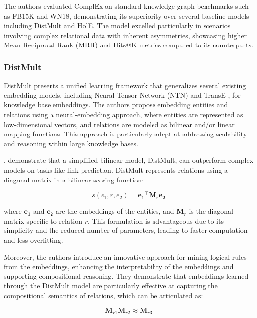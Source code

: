 \documentclass[12pt]{article}
\begin{document}
\sloppy
The authors evaluated ComplEx on standard knowledge graph benchmarks such as FB15K and WN18, demonstrating its superiority over several baseline models including DistMult and HolE. The model excelled particularly in scenarios involving complex relational data with inherent asymmetries, showcasing higher Mean Reciprocal Rank (MRR) and Hits@K metrics compared to its counterparts.
\sloppy

\subsubsection{DistMult}
DistMult \textcite{yang2015embedding} presents a unified learning framework that generalizes several existing embedding models, including Neural Tensor Network (NTN) and TransE \textcite{bordes2013translating}, for knowledge base embeddings. The authors propose embedding entities and relations using a neural-embedding approach, where entities are represented as low-dimensional vectors, and relations are modeled as bilinear and/or linear mapping functions. This approach is particularly adept at addressing scalability and reasoning within large knowledge bases.

\textcite{yang2015embedding}. demonstrate that a simplified bilinear model, DistMult, can outperform complex models on tasks like link prediction. DistMult represents relations using a diagonal matrix in a bilinear scoring function:

\begin{equation}
s(e_1, r, e_2) = \mathbf{e_1}^\top \mathbf{M}_r \mathbf{e_2}
\end{equation}

where $\mathbf{e_1}$ and $\mathbf{e_2}$ are the embeddings of the entities, and $\mathbf{M}_r$ is the diagonal matrix specific to relation $r$. This formulation is advantageous due to its simplicity and the reduced number of parameters, leading to faster computation and less overfitting.

Moreover, the authors introduce an innovative approach for mining logical rules from the embeddings, enhancing the interpretability of the embeddings and supporting compositional reasoning. They demonstrate that embeddings learned through the DistMult model are particularly effective at capturing the compositional semantics of relations, which can be articulated as:

\begin{equation}
\mathbf{M}_{r1} \mathbf{M}_{r2} \approx \mathbf{M}_{r3}
\end{equation}
\end{document}
